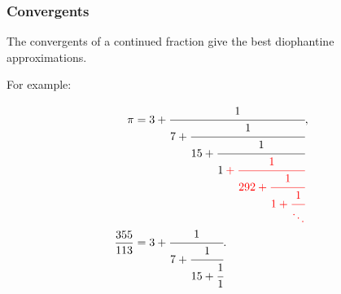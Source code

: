 \begin{frame}
\frametitle{Convergents}

The convergents of a continued fraction give the best diophantine approximations.

For example:

\begin{equation*}
	\begin{aligned}
			\pi & =
			3 + \cfrac{1}{7 + \cfrac{1}{15 + \cfrac{1}{1 \color{red} + \cfrac{1}{292 + \cfrac{1}{1 + \cfrac{1}{\ddots}}}}}},\\
			\dfrac{355}{113} & =
			3 + \cfrac{1}{7 + \cfrac{1}{15 + \cfrac{1}{1}}}.
	\end{aligned}
\end{equation*}

\end{frame}

